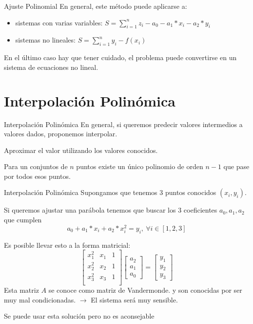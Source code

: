 \documentclass[xcolor=svgnames]{beamer} %
\theoremstyle{plain}
\theoremstyle{definition}
\begin{document}
\begin{frame}{Ajuste Polinomial}
 En general, este método puede aplicarse a:
 \begin{itemize}
 \item sistemas con varias variables: $ S = \sum_{i=1}^n z_i- a_0 -a_1*x_i -a_2*y_i$
 \item sistemas no lineales:  $ S = \sum_{i=1}^n y_i- f(x_i)$
 \end{itemize}\pause
 En el último caso hay que tener cuidado, el problema puede convertirse en un sistema de ecuaciones no lineal.
\end{frame}


\section{Interpolación Polinómica}

\begin{frame}{Interpolación Polinómica}
  En general, si queremos predecir valores intermedios a valores dados, proponemos interpolar.  \pause

  \begin{tcolorbox}Aproximar el valor utilizando los valores conocidos.\end{tcolorbox} \pause


  Para un conjuntos de $n$ puntos existe un único polinomio de orden $n-1$ que pase por todos esos puntos.

\end{frame}

\begin{frame}{Interpolación Polinómica}
\small  
  Supongamos que tenemos 3 puntos conocidos $(x_i,y_i)$.


  Si queremos ajustar una parábola tenemos que buscar los 3 coeficientes $a_0,a_1,a_2$ que cumplen 
  $$ a_0 + a_1*x_i+ a_2*x_i^2 = y_i ,\ \forall i \in [1,2,3]$$\pause

  Es posible llevar esto a la forma matricial:
  $$\begin{bmatrix}
      x_1^2 & x_1 & 1 \\
      x_2^2 & x_2 & 1 \\
      x_3^2 & x_3 & 1 \\
    \end{bmatrix} \begin{bmatrix}
      a_2\\
      a_1\\
      a_0
    \end{bmatrix} = \begin{bmatrix}
      y_1\\
      y_2\\
      y_3
    \end{bmatrix}$$
  Esta matriz $A$ se conoce como matriz de Vandermonde. y son conocidas por ser muy mal condicionadas. \pause $\rightarrow$ El sistema será muy sensible.\pause

  \begin{tcolorbox}
    Se puede usar esta solución pero no es aconsejable
  \end{tcolorbox}
\end{frame}
\end{document}
